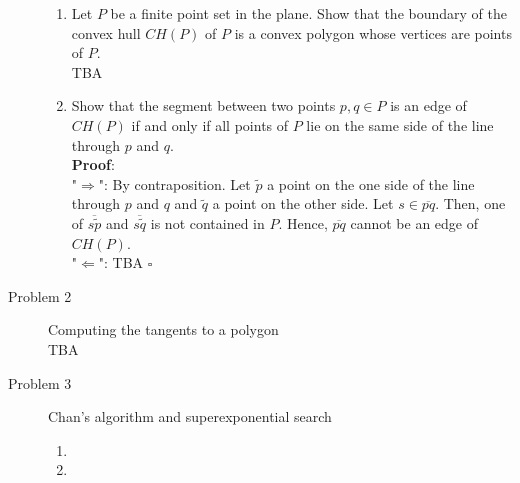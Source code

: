\documentclass[11pt,a4paper,ngerman]{article}
\begin{document}
\begin{description}
\begin{enumerate}
    \item Let $P$ be a finite point set in the plane.
          Show that the boundary of the convex hull $CH(P)$ of $P$ is a convex polygon
          whose vertices are points of $P$. \\
    
          TBA
    \item Show that the segment between two points $p, q \in P$ is an edge of $CH(P)$ if
          and only if all points of $P$ lie on the same side of the line through $p$ and $q$. \\

          \textbf{Proof}: \\
          "$\Rightarrow$": By contraposition. Let $\tilde{p}$ a point on the one side of the line
                           through $p$ and $q$ and $\tilde{q}$ a point on the other side.
                           Let $s \in \overline{pq}$. Then, one of $\overline{s\tilde{p}}$ 
                           and $\overline{s\tilde{q}}$ is not contained in $P$. Hence,
                           $\overline{pq}$ cannot be an edge of $CH(P)$. \\
          "$\Leftarrow$": TBA
          \mbox{} \hfill $\square$
  \end{enumerate}

\item[Problem 2] Computing the tangents to a polygon \\

TBA
\item[Problem 3] Chan's algorithm and superexponential search
  \begin{enumerate}
    \item 
    \item 
  \end{enumerate}

\end{description}

\label{LastPage}
\end{document}
